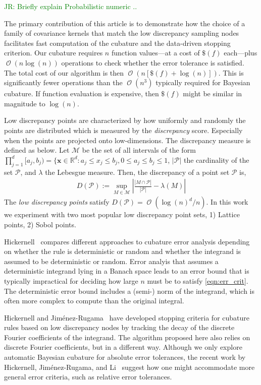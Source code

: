 \documentclass{iitthesis}          %
\DeclareMathOperator{\Order}{{\mathcal O}}
\newcommand{\bm}[1]{\boldsymbol{#1}}
\newcommand{\vx}{\bm{x}}
\def\abs#1{\ensuremath{\left \lvert #1 \right \rvert}}
\newcommand{\JRNote}[1]{{\textcolor{green}{JR: #1}}}
\begin{document}
\JRNote{Briefly explain Probabilistic numeric ..}

The primary contribution of this article is to demonstrate how the choice of a family of covariance kernels that match the low discrepancy sampling nodes facilitates fast computation of the cubature and the data-driven stopping criterion.  Our cubature requires $n$ function values---at a cost of $\$(f)$ each---plus $\Order(n \log(n))$ operations to check whether the error tolerance is satisfied.  The total cost of our algorithm is then $\Order(n [\$(f) + \log(n)])$.  This is significantly fewer operations than the $\Order(n^3)$ typically required for Bayesian cubature.  If function evaluation is expensive, then $\$(f)$ might be similar in magnitude to $\log(n)$.


Low discrepancy points are characterized by how uniformly and randomly the points are distributed which is measured by the \emph{discrepancy} score. Especially when the points are projected onto low-dimensions. The discrepancy measure is defined as below.
Let $\mathcal{M}$ be the set of all intervals of the form $\prod_{j=1}^{d} [a_j, b_j) = \{ \vx \in \mathbb{R}^d : a_j \le x_j \le b_j, 0 \le a_j \le b_j \le 1$, $\abs{\mathcal{P}}$ the cardinality of the set $\mathcal{P}$, and $\lambda$ the
Lebesgue measure. Then, the discrepancy of a point set $\mathcal{P}$ is,
\begin{align*}
D(\mathcal{P}) := \sup_{M \in \mathcal{M}} 
\abs{ \frac{\abs{M \cap \mathcal{P}}}{\abs{\mathcal{P}}} - \lambda(M) }
\end{align*}
The \emph{low discrepancy points} satisfy $D(\mathcal{P}) = \Order(\log(n)^d/n)$.
In this work we experiment with two most popular low discrepancy point sets, 1) Lattice points, 2) Sobol points.


Hickernell~\cite{Hic17a} compares different approaches to cubature error analysis depending on whether the rule is deterministic or random and whether the integrand is assumed to be deterministic or random.  Error analyis that assumes a deterministic integrand lying in a Banach space leads to an error bound that is typically impractical for deciding how large $n$ must be to satisfy \eqref{eqn:err_crit}.  The deterministic error bound includes a (semi-) norm of the integrand, which is often more complex to compute than the original integral.

Hickernell and Jim\'enez-Rugama~\cite{HicJim16a,JimHic16a} have developed stopping criteria for cubature rules based on low discrepancy nodes by tracking the decay of the discrete Fourier coefficients of the integrand.  The algorithm proposed here also relies on discrete Fourier coefficients, but in a different way.  Although we only explore automatic Bayesian cubature for absolute error tolerances, the recent work by Hickernell, Jim\'enez-Rugama, and Li~\cite{HicEtal17a} suggest how one might accommodate more general error criteria, such as relative error tolerances.
\end{document}
